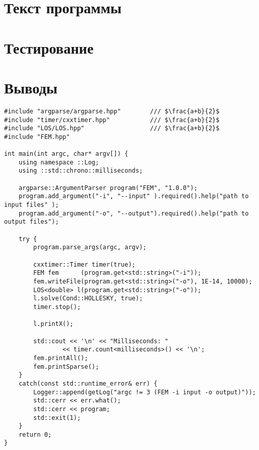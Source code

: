\documentclass[12pt,a4paper]{article}
\begin{document}
\section{Текст программы}

\section{Тестирование}

\section{Выводы}


\begin{verbatim}
#include "argparse/argparse.hpp"        /// $\frac{a+b}{2}$
#include "timer/cxxtimer.hpp"           /// $\frac{a+b}{2}$
#include "LOS/LOS.hpp"                  /// $\frac{a+b}{2}$
#include "FEM.hpp"

int main(int argc, char* argv[]) {
    using namespace ::Log;
    using ::std::chrono::milliseconds;

    argparse::ArgumentParser program("FEM", "1.0.0");
    program.add_argument("-i", "--input" ).required().help("path to input files" );
    program.add_argument("-o", "--output").required().help("path to output files");

    try {
        program.parse_args(argc, argv);

        cxxtimer::Timer timer(true);
        FEM fem      (program.get<std::string>("-i"));
        fem.writeFile(program.get<std::string>("-o"), 1E-14, 10000);
        LOS<double> l(program.get<std::string>("-o"));
        l.solve(Cond::HOLLESKY, true);
        timer.stop();

        l.printX();

        std::cout << '\n' << "Milliseconds: "
                << timer.count<milliseconds>() << '\n';
        fem.printAll();
        fem.printSparse();
    }
    catch(const std::runtime_error& err) {
        Logger::append(getLog("argc != 3 (FEM -i input -o output)"));
        std::cerr << err.what();
        std::cerr << program;
        std::exit(1);
    }
    return 0;
}
\end{verbatim}
\end{document}
